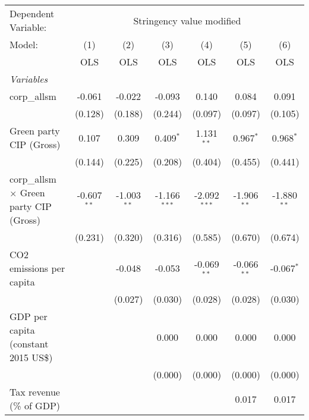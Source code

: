 
\begingroup
\centering
\begin{tabular}{lcccccc}
   \toprule
   Dependent Variable: & \multicolumn{6}{c}{Stringency value modified}\\
   Model:                                         & (1)           & (2)           & (3)            & (4)            & (5)           & (6)\\  
                                                  &  OLS          & OLS           & OLS            & OLS            & OLS           & OLS\\  
   \midrule
   \emph{Variables}\\
   corp\_allsm                                    & -0.061        & -0.022        & -0.093         & 0.140          & 0.084         & 0.091\\   
                                                  & (0.128)       & (0.188)       & (0.244)        & (0.097)        & (0.097)       & (0.105)\\   
   Green party CIP (Gross)                        & 0.107         & 0.309         & 0.409$^{*}$    & 1.131$^{**}$   & 0.967$^{*}$   & 0.968$^{*}$\\   
                                                  & (0.144)       & (0.225)       & (0.208)        & (0.404)        & (0.455)       & (0.441)\\   
   corp\_allsm $\times$ Green party CIP (Gross)   & -0.607$^{**}$ & -1.003$^{**}$ & -1.166$^{***}$ & -2.092$^{***}$ & -1.906$^{**}$ & -1.880$^{**}$\\   
                                                  & (0.231)       & (0.320)       & (0.316)        & (0.585)        & (0.670)       & (0.674)\\   
   CO2 emissions per capita                       &               & -0.048        & -0.053         & -0.069$^{**}$  & -0.066$^{**}$ & -0.067$^{*}$\\   
                                                  &               & (0.027)       & (0.030)        & (0.028)        & (0.028)       & (0.030)\\   
   GDP per capita (constant 2015 US\$)            &               &               & 0.000          & 0.000          & 0.000         & 0.000\\   
                                                  &               &               & (0.000)        & (0.000)        & (0.000)       & (0.000)\\   
   Tax revenue (\% of GDP)                        &               &               &                &                & 0.017         & 0.017\\   

\end{tabular}

